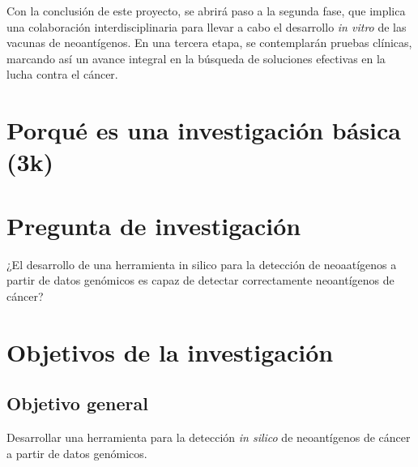 \documentclass[a4paper,11pt]{article}
\begin{document}
Con la conclusión de este proyecto, se abrirá paso a la segunda fase, que implica una colaboración interdisciplinaria para llevar a cabo el desarrollo \textit{in vitro} de las vacunas de neoantígenos. En una tercera etapa, se contemplarán pruebas clínicas, marcando así un avance integral en la búsqueda de soluciones efectivas en la lucha contra el cáncer.







\section{Porqué es una investigación básica (3k)}
	
\section{Pregunta de investigación}	

¿El desarrollo de una herramienta in silico para la detección de neoaatígenos a partir de datos genómicos es capaz de detectar correctamente neoantígenos de cáncer?
	
\section{Objetivos de la investigación}
	
	\subsection{Objetivo general}
	
	Desarrollar una herramienta  para la detección \textit{in silico} de neoantígenos de cáncer a partir de datos genómicos.
	
\end{document}
